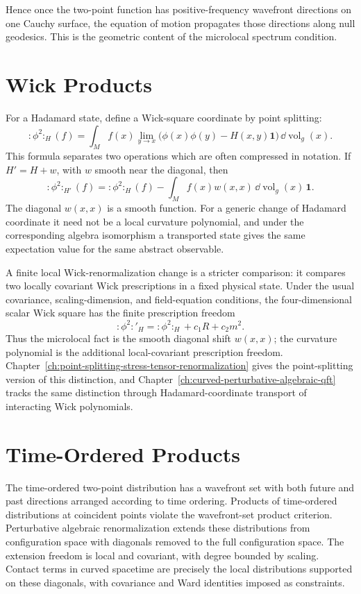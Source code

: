 Hence once the two-point function has positive-frequency wavefront
directions on one Cauchy surface, the equation of motion propagates those
directions along null geodesics.  This is the geometric content of the
microlocal spectrum condition.

\section{Wick Products}

For a Hadamard state, define a Wick-square coordinate by point splitting:
\[
  :\!\phi^2\!:_H(f)
  =
  \int_M f(x)
  \lim_{y\to x}
  \bigl(\phi(x)\phi(y)-H(x,y)\mathbf 1\bigr)\,\dd\operatorname{vol}_g(x).
\]
This formula separates two operations which are often compressed in notation.
If \(H'=H+w\), with \(w\) smooth near the diagonal, then
\[
  :\!\phi^2\!:_{H'}(f)
  =
  :\!\phi^2\!:_{H}(f)
  -
  \int_M f(x)w(x,x)\,\dd\operatorname{vol}_g(x)\,\mathbf 1 .
\]
The diagonal \(w(x,x)\) is a smooth function.  For a generic change of
Hadamard coordinate it need not be a local curvature polynomial, and under
the corresponding algebra isomorphism a transported state gives the same
expectation value for the same abstract observable.

A finite local Wick-renormalization change is a stricter comparison: it
compares two locally covariant Wick prescriptions in a fixed physical state.
Under the usual covariance, scaling-dimension, and field-equation conditions,
the four-dimensional scalar Wick square has the finite prescription freedom
\[
  :\!\phi^2\!:'_H
  =
  :\!\phi^2\!:_H
  +
  c_1R+c_2m^2 .
\]
Thus the microlocal fact is the smooth diagonal shift \(w(x,x)\); the
curvature polynomial is the additional local-covariant prescription freedom.
Chapter~\ref{ch:point-splitting-stress-tensor-renormalization} gives the
point-splitting version of this distinction, and
Chapter~\ref{ch:curved-perturbative-algebraic-qft} tracks the same
distinction through Hadamard-coordinate transport of interacting Wick
polynomials.

\section{Time-Ordered Products}

The time-ordered two-point distribution has a wavefront set with both
future and past directions arranged according to time ordering.  Products of
time-ordered distributions at coincident points violate the wavefront-set
product criterion.  Perturbative algebraic renormalization extends these
distributions from configuration space with diagonals removed to the full
configuration space.  The extension freedom is local and covariant, with
degree bounded by scaling.  Contact terms in curved spacetime are precisely
the local distributions supported on these diagonals, with covariance and
Ward identities imposed as constraints.

